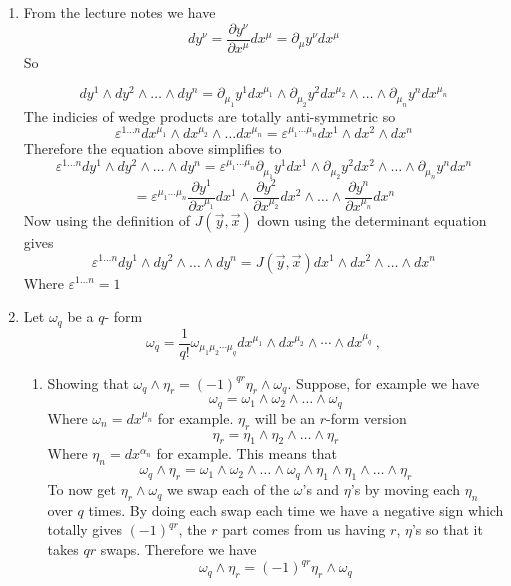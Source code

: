\documentclass[12pt]{article}
\begin{document}
\begin{enumerate}
\item From the lecture notes we have 
$$ dy^{\nu} = \frac{\partial y^{\nu} }{\partial x^{\mu}} dx^{\mu} = \partial_{\mu} y^{\nu} dx^{\mu} $$
So 

$$  dy^1 \wedge dy^2 \wedge \ldots \wedge dy^n = \partial_{\mu_1} y^1 dx^{\mu_1} \wedge \partial_{\mu_2} y^2 dx^{\mu_2} \wedge \ldots \wedge \partial_{\mu_n} y^n dx^{\mu_n} $$ 
The indicies of wedge products are totally anti-symmetric so 
$$ \varepsilon^{1 \ldots n} d x^{\mu_1} \wedge dx^{\mu_2} \wedge \ldots dx^{\mu_n} = \varepsilon^{\mu_1 \ldots \mu_n} dx^1 \wedge dx^2 \wedge dx^n $$
Therefore the equation above simplifies to 
$$ \varepsilon^{1 \ldots n} dy^1 \wedge dy^2 \wedge \ldots \wedge dy^n = \varepsilon^{\mu_1 \ldots \mu_n} \partial_{\mu_1} y^1 dx^1 \wedge \partial_{\mu_2} y^2 dx^2 \wedge \ldots \wedge \partial_{\mu_n} y^n dx^n $$
$$ = \varepsilon^{\mu_1 \ldots \mu_n} \frac{\partial y^1}{\partial x^{\mu_1}} dx^1 \wedge \frac{\partial y^2}{\partial x^{\mu_2}} dx^2 \wedge \ldots \wedge \frac{\partial y^n}{\partial x^{\mu_n}} dx^n $$  
Now using the definition of $J({\vec y},{\vec x})$ down using the determinant equation gives 
$$ \varepsilon^{1 \ldots n} dy^1 \wedge dy^2 \wedge \ldots \wedge dy^n = J({\vec y},{\vec x}) dx^1 \wedge dx^2 \wedge \ldots \wedge dx^n $$
Where $\varepsilon^{1 \ldots n} =1$

\item Let $\omega_q$ be a $q$- form 
$$
   \omega_q = \frac{1}{q!} \omega_{\mu_1\mu_2\cdots \mu_q} dx^{\mu_1}\wedge dx^{\mu_2} \wedge \cdots \wedge dx^{\mu_q} \ ,
 $$

 \begin{enumerate}
   \item Showing that $\omega_q \wedge \eta_r = (-1)^{qr} \eta_r \wedge \omega_q$. Suppose, for example we have 
   $$ \omega_q = \omega_1 \wedge \omega_2 \wedge \ldots \wedge \omega_q $$
   Where $\omega_n = d x^{\mu_n}$ for example. $\eta_r$ will be an $r$-form version 
   $$ \eta_r = \eta_1 \wedge \eta_2 \wedge \ldots \wedge \eta_r $$
   Where $\eta_n = dx^{\alpha_n}$ for example. This means that 
   $$ \omega_q \wedge \eta_r =  \omega_1 \wedge \omega_2 \wedge \ldots \wedge \omega_q \wedge \eta_1 \wedge \eta_1 \wedge \ldots \wedge \eta_r $$
   To now get $ \eta_r \wedge \omega_q$ we swap each of the $\omega$'s and $\eta$'s by moving each $\eta_n$ over $q$ times. By doing each swap each time we have a negative sign which totally gives $(-1)^{qr}$, the $r$ part comes from us having $r$, $\eta$'s so that it takes $qr$ swaps. Therefore we have 
   $$ \omega_q \wedge \eta_r = (-1)^{qr} \eta_r \wedge \omega_q $$


\end{enumerate}
\end{enumerate}
\end{document}

